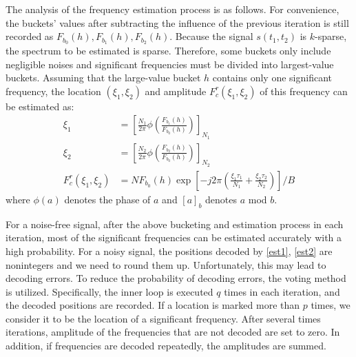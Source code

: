 \documentclass[conference]{IEEEtran}
\begin{document}
The analysis of the frequency estimation process is as follows. For convenience, the buckets' values after subtracting the influence of the previous iteration is still recorded as $	{F_{{b_0}}}(h),	{F_{{b_1}}}(h),	{F_{{b_2}}}(h)$. Because the signal $s({t_1}, {t_2})$ is $k$-sparse, the spectrum to be estimated is sparse. Therefore, some buckets only include negligible noises and significant frequencies must be divided into largest-value buckets. Assuming that the large-value bucket $h$ contains only one significant frequency, the location $({\xi _1},{\xi _2})$ and amplitude ${F_c^r}({\xi _1},{\xi _2})$ of this frequency can be estimated as:
\begin{align} \label{est1}
	{\xi _1} &= {\left[\frac{{{N_1}}}{{2\pi }}\phi (\frac{{{F_{{b_1}}}(h)}}{{{F_{{b_0}}}(h)}})\right]_{{N_1}}}\\ \label{est2}
	{\xi _2} &= {\left[\frac{{{N_2}}}{{2\pi }}\phi (\frac{{{F_{{b_2}}}(h)}}{{{F_{{b_0}}}(h)}})\right]_{{N_2}}}\\
	F_c^r({\xi _1},{\xi _2}) &= N{F_{{b_0}}}(h)\exp \left[ - j2\pi (\frac{{{\xi_1}{\tau _1}}}{{{N_1}}} + \frac{{{\xi_2}{\tau _2}}}{{{N_2}}})\right]/B
\end{align}
where $\phi (a)$ denotes the phase of $a$ and ${[a]_b}$ denotes $a$ mod $b$.

For a noise-free signal, after the above bucketing and estimation process in each iteration, most of the significant frequencies can be estimated accurately with a high probability. For a noisy signal, the positions decoded by \eqref{est1}, \eqref{est2} are nonintegers and we need to round them up. Unfortunately, this may lead to decoding errors. To reduce the probability of decoding errors, the voting method is utilized. Specifically, the inner loop is executed $q$ times in each iteration, and the decoded positions are recorded. If a location is marked more than $p$ times, we consider it to be the location of a significant frequency. After several times iterations, amplitude of the frequencies that are not decoded are set to zero. In addition, if frequencies are decoded repeatedly, the amplitudes are summed.
\end{document}
